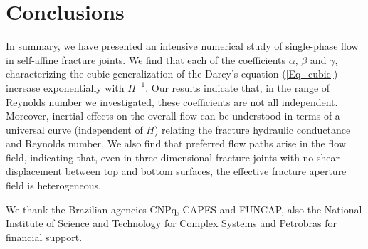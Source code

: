 \documentclass[aps,pre,
superscriptaddress,
twocolumn,
notitlepage,
10pt,]{revtex4-1}
\begin{document}
\section{Conclusions}\label{conclusion}

In summary, we have presented an intensive numerical study of single-phase flow in
self-affine fracture joints. We find that each of the coefficients $\alpha$,
$\beta$ and $\gamma$, characterizing the cubic generalization of the Darcy's
equation (\ref{Eq_cubic}) increase exponentially with $H^{-1}$. Our results
indicate that, in the range of Reynolds number  we investigated, these
coefficients are not all independent. Moreover,  inertial effects on the
overall flow can be understood in terms of a universal curve (independent of
$H$) relating the fracture hydraulic conductance and Reynolds number. We
also find that preferred flow paths arise in the flow field, indicating
that, even in three-dimensional fracture joints with no shear displacement
between top and bottom surfaces, the effective fracture aperture field is
heterogeneous.


\begin{acknowledgments}
	We thank the Brazilian agencies CNPq, CAPES and FUNCAP, also the National
	Institute of Science and Technology for Complex Systems and Petrobras for
	financial support.
\end{acknowledgments}


\end{document}
